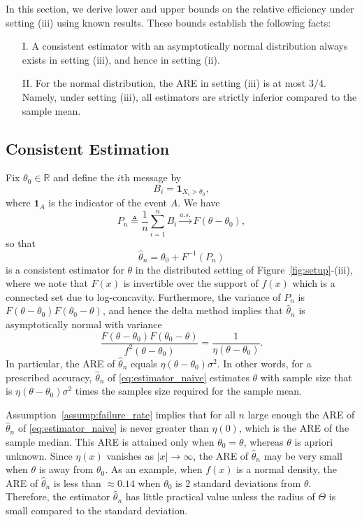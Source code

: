 \documentclass[letterpaper, 11pt]{IEEEtran}      %
\begin{document}
In this section, we derive lower and upper bounds on the relative efficiency under setting (iii) using known results. These bounds establish the following facts:
\begin{itemize}
\item[I.] A consistent estimator with an asymptotically normal distribution always exists in setting (iii), and hence in setting (ii). 
\item[II.] For the normal distribution, the ARE in setting (iii) is at most $3/4$. Namely, under setting (iii), all estimators are strictly inferior compared to the sample mean. 
\end{itemize}

\subsection{Consistent Estimation}
Fix $\theta_0 \in \mathbb R$ and define the $i$th message by 
\[
B_i = \mathbf 1_{X_i>\theta_0}, 
\]
where $\mathbf 1_A$ is the indicator of the event $A$. We have
\[
P_n \triangleq\frac{1}{n} \sum_{i=1}^n B_i \overset{a.s.}{\rightarrow} F(\theta - \theta_0),  
\]
so that 
\begin{equation}
\label{eq:estimator_naive}
\hat{\theta}_n = \theta_0 + F^{-1}\left( P_n \right)
\end{equation}
is a consistent estimator for $\theta$ in the distributed setting of Figure~\ref{fig:setup}-(iii), where we note that $F(x)$ is invertible over the support of $f(x)$ which is a connected set due to log-concavity. Furthermore, the variance of $P_n$ is $F(\theta-\theta_0)F(\theta_0-\theta)$, and hence the delta method implies that $\hat{\theta}_n$ is asymptotically normal with variance 
\begin{equation} 
 \frac{F(\theta-\theta_0)F(\theta_0-\theta)}{f^2(\theta-\theta_0)} = \frac{1}{
\eta(\theta-\theta_0)}.
\end{equation}
In particular, the ARE of $\hat{\theta}_n$ equals $\eta(\theta - \theta_0)\sigma^2$. In other words, for a prescribed accuracy, $\hat{\theta}_n$ of  \eqref{eq:estimator_naive} estimates $\theta$ with sample size that is $\eta(\theta- \theta_0)  \sigma^2$ times the samples size required for the sample mean. \par
%
%
Assumption~\ref{assump:failure_rate} implies that for  all $n$ large enough the ARE of $\hat{\theta}_n$ of \eqref{eq:estimator_naive} is never greater than $\eta(0)$, which is the ARE of the sample median. This ARE is attained only when $\theta_0 = \theta$, whereas $\theta$ is apriori unknown. Since $\eta(x)$ vanishes as $|x|\rightarrow \infty$, the ARE of $\hat{\theta}_n$ may be very small when $\theta$ is away from $\theta_0$. As an example, when $f(x)$ is a normal density, the ARE of $\hat{\theta}_n$ is less than $\approx 0.14$ when $\theta_0$ is $2$ standard deviations from $\theta$. Therefore, the estimator $\hat{\theta}_n$ has little practical value unless the radius of $\Theta$ is small compared to the standard deviation. \par 
\end{document}
